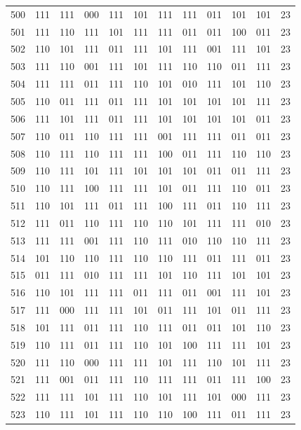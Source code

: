 \begin{longtable}{r*{10}{c}r}
500 & 111 & 111 & 000 & 111 & 101 & 111 & 111 & 011 & 101 & 101 & 23\\
501 & 111 & 110 & 111 & 101 & 111 & 111 & 011 & 011 & 100 & 011 & 23\\
502 & 110 & 101 & 111 & 011 & 111 & 101 & 111 & 001 & 111 & 101 & 23\\
503 & 111 & 110 & 001 & 111 & 101 & 111 & 110 & 110 & 011 & 111 & 23\\
504 & 111 & 111 & 011 & 111 & 110 & 101 & 010 & 111 & 101 & 110 & 23\\
505 & 110 & 011 & 111 & 011 & 111 & 101 & 101 & 101 & 101 & 111 & 23\\
506 & 111 & 101 & 111 & 011 & 111 & 101 & 101 & 101 & 101 & 011 & 23\\
507 & 110 & 011 & 110 & 111 & 111 & 001 & 111 & 111 & 011 & 011 & 23\\
508 & 110 & 111 & 110 & 111 & 111 & 100 & 011 & 111 & 110 & 110 & 23\\
509 & 110 & 111 & 101 & 111 & 101 & 101 & 101 & 011 & 011 & 111 & 23\\
510 & 110 & 111 & 100 & 111 & 111 & 101 & 011 & 111 & 110 & 011 & 23\\
511 & 110 & 101 & 111 & 011 & 111 & 100 & 111 & 011 & 110 & 111 & 23\\
512 & 111 & 011 & 110 & 111 & 110 & 110 & 101 & 111 & 111 & 010 & 23\\
513 & 111 & 111 & 001 & 111 & 110 & 111 & 010 & 110 & 110 & 111 & 23\\
514 & 101 & 110 & 110 & 111 & 110 & 110 & 111 & 011 & 111 & 011 & 23\\
515 & 011 & 111 & 010 & 111 & 111 & 101 & 110 & 111 & 101 & 101 & 23\\
516 & 110 & 101 & 111 & 111 & 011 & 111 & 011 & 001 & 111 & 101 & 23\\
517 & 111 & 000 & 111 & 111 & 101 & 011 & 111 & 101 & 011 & 111 & 23\\
518 & 101 & 111 & 011 & 111 & 110 & 111 & 011 & 011 & 101 & 110 & 23\\
519 & 110 & 111 & 011 & 111 & 110 & 101 & 100 & 111 & 111 & 101 & 23\\
520 & 111 & 110 & 000 & 111 & 111 & 101 & 111 & 110 & 101 & 111 & 23\\
521 & 111 & 001 & 011 & 111 & 110 & 111 & 111 & 011 & 111 & 100 & 23\\
522 & 111 & 111 & 101 & 111 & 110 & 101 & 111 & 101 & 000 & 111 & 23\\
523 & 110 & 111 & 101 & 111 & 110 & 110 & 100 & 111 & 011 & 111 & 23\\

\end{longtable}

